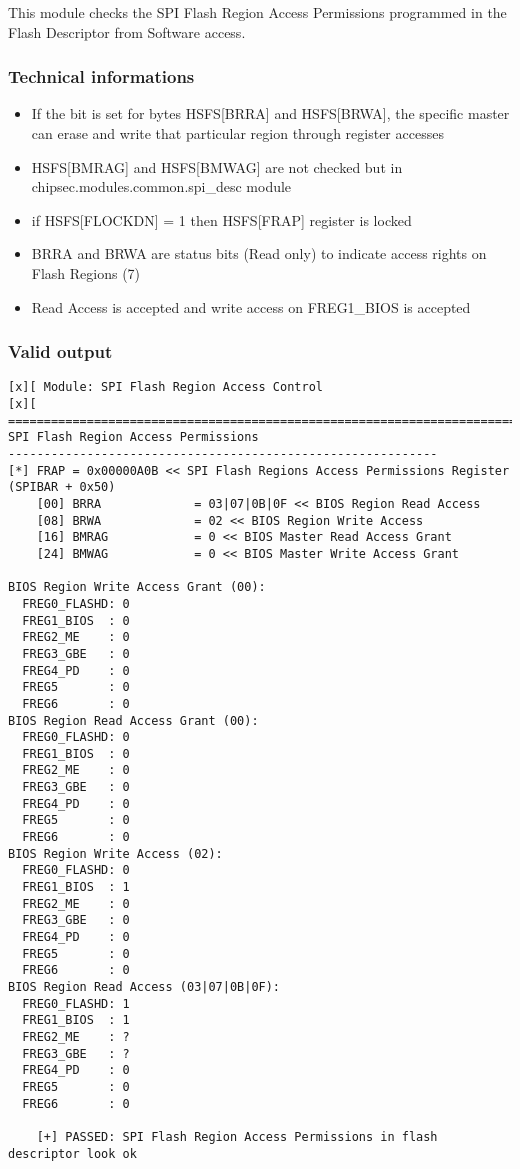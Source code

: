 This module checks the SPI Flash Region Access Permissions programmed in
the Flash Descriptor from Software access.

\hypertarget{technical-informations-15}{%
\subsubsection{Technical informations}\label{technical-informations-15}}

\begin{itemize}
\tightlist
\item
  If the bit is set for bytes HSFS{[}BRRA{]} and HSFS{[}BRWA{]}, the
  specific master can erase and write that particular region through
  register accesses
\item
  HSFS{[}BMRAG{]} and HSFS{[}BMWAG{]} are not checked but in
  chipsec.modules.common.spi\_desc module
\item
  if HSFS{[}FLOCKDN{]} = 1 then HSFS{[}FRAP{]} register is locked
\item
  BRRA and BRWA are status bits (Read only) to indicate access rights on
  Flash Regions (7)
\item
  Read Access is accepted and write access on FREG1\_BIOS is accepted
\end{itemize}

\hypertarget{valid-output-16}{%
\subsubsection{Valid output}\label{valid-output-16}}

\begin{verbatim}
[x][ Module: SPI Flash Region Access Control
[x][ =======================================================================
SPI Flash Region Access Permissions
------------------------------------------------------------
[*] FRAP = 0x00000A0B << SPI Flash Regions Access Permissions Register (SPIBAR + 0x50)
    [00] BRRA             = 03|07|0B|0F << BIOS Region Read Access 
    [08] BRWA             = 02 << BIOS Region Write Access 
    [16] BMRAG            = 0 << BIOS Master Read Access Grant 
    [24] BMWAG            = 0 << BIOS Master Write Access Grant 

BIOS Region Write Access Grant (00):
  FREG0_FLASHD: 0
  FREG1_BIOS  : 0
  FREG2_ME    : 0
  FREG3_GBE   : 0
  FREG4_PD    : 0
  FREG5       : 0
  FREG6       : 0
BIOS Region Read Access Grant (00):
  FREG0_FLASHD: 0
  FREG1_BIOS  : 0
  FREG2_ME    : 0
  FREG3_GBE   : 0
  FREG4_PD    : 0
  FREG5       : 0
  FREG6       : 0
BIOS Region Write Access (02):
  FREG0_FLASHD: 0
  FREG1_BIOS  : 1
  FREG2_ME    : 0
  FREG3_GBE   : 0
  FREG4_PD    : 0
  FREG5       : 0
  FREG6       : 0
BIOS Region Read Access (03|07|0B|0F):
  FREG0_FLASHD: 1
  FREG1_BIOS  : 1
  FREG2_ME    : ?
  FREG3_GBE   : ?
  FREG4_PD    : 0
  FREG5       : 0
  FREG6       : 0

    [+] PASSED: SPI Flash Region Access Permissions in flash descriptor look ok
\end{verbatim}

